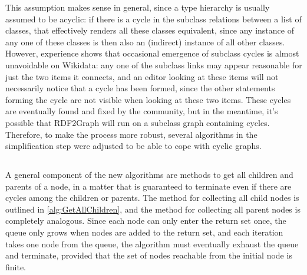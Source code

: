 This assumption makes sense in general,
since a type hierarchy is usually assumed to be acyclic:
if there is a cycle in the subclass relations between a list of classes,
that effectively renders all these classes equivalent,
since any instance of any one of these classes is then also an (indirect) instance of all other classes.
However, experience shows %
that occasional emergence of subclass cycles is almost unavoidable on Wikidata:
any one of the subclass links may appear reasonable for just the two items it connects,
and an editor looking at these items will not necessarily notice that a cycle has been formed,
since the other statements forming the cycle are not visible when looking at these two items.
These cycles are eventually found and fixed by the community,
but in the meantime, it’s possible that RDF2Graph will run on a subclass graph containing cycles.
Therefore, to make the process more robust, %
several algorithms in the simplification step were adjusted to be able to cope with cyclic graphs.

\subsection{}
\label{subsec:RDF2Graph+Wikidata:cyclic-graphs:GetAllChildren}

A general component of the new algorithms are methods to get all children and parents of a node,
in a matter that is guaranteed to terminate even if there are cycles among the children or parents.
The method for collecting all child nodes is outlined in \cref{alg:GetAllChildren},
and the method for collecting all parent nodes is completely analogous.
Since each node can only enter the return set once,
the queue only grows when nodes are added to the return set,
and each iteration takes one node from the queue,
the algorithm must eventually exhaust the queue and terminate,
provided that the set of nodes reachable from the initial node is finite.

